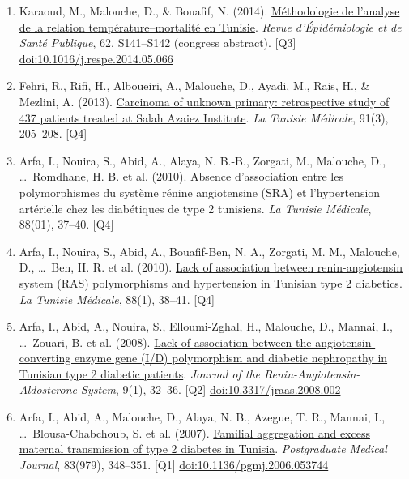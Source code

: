 \documentclass[10pt,a4paper]{article}
\newcommand{\doi}[1]{\href{https://doi.org/#1}{doi:#1}}
\newcommand{\Qu}[1]{[Q#1]}
\begin{document}
\begin{enumerate}
\item Karaoud, M., Malouche, D., \& Bouafif, N. (2014). \href{https://www.em-consulte.com/article/911552/article/methodologie-de-l-analyse-de-la-relation-temperatu}{M\'ethodologie de l'analyse de la relation temp\'erature--mortalit\'e en Tunisie}. \emph{Revue d'\'Epid\'emiologie et de Sant\'e Publique}, 62, S141--S142 (congress abstract). \Qu3 \doi{10.1016/j.respe.2014.05.066}
\item Fehri, R., Rifi, H., Alboueiri, A., Malouche, D., Ayadi, M., Rais, H., \& Mezlini, A. (2013). \href{https://pubmed.ncbi.nlm.nih.gov/23588636/}{Carcinoma of unknown primary: retrospective study of 437 patients treated at Salah Azaiez Institute}. \emph{La Tunisie M\'edicale}, 91(3), 205--208. \Qu4
\item Arfa, I., Nouira, S., Abid, A., Alaya, N. B.-B., Zorgati, M., Malouche, D., \ldots\ Romdhane, H. B. et al. (2010). Absence d'association entre les polymorphismes du syst\`eme r\'enine angiotensine (SRA) et l'hypertension art\'erielle chez les diab\'etiques de type 2 tunisiens. \emph{La Tunisie M\'edicale}, 88(01), 37--40. \Qu4
\item Arfa, I., Nouira, S., Abid, A., Bouafif-Ben, N. A., Zorgati, M. M., Malouche, D., \ldots\ Ben, H. R. et al. (2010). \href{https://pubmed.ncbi.nlm.nih.gov/20415212/}{Lack of association between renin-angiotensin system (RAS) polymorphisms and hypertension in Tunisian type 2 diabetics}. \emph{La Tunisie M\'edicale}, 88(1), 38--41. \Qu4
\item Arfa, I., Abid, A., Nouira, S., Elloumi-Zghal, H., Malouche, D., Mannai, I., \ldots\ Zouari, B. et al. (2008). \href{https://doi.org/10.3317/jraas.2008.002}{Lack of association between the angiotensin-converting enzyme gene (I/D) polymorphism and diabetic nephropathy in Tunisian type 2 diabetic patients}. \emph{Journal of the Renin-Angiotensin-Aldosterone System}, 9(1), 32--36. \Qu2 \doi{10.3317/jraas.2008.002}
\item Arfa, I., Abid, A., Malouche, D., Alaya, N. B., Azegue, T. R., Mannai, I., \ldots\ Blousa-Chabchoub, S. et al. (2007). \href{https://pmc.ncbi.nlm.nih.gov/articles/PMC2600082/}{Familial aggregation and excess maternal transmission of type 2 diabetes in Tunisia}. \emph{Postgraduate Medical Journal}, 83(979), 348--351. \Qu1 \doi{10.1136/pgmj.2006.053744}


\end{enumerate}
\end{document}
